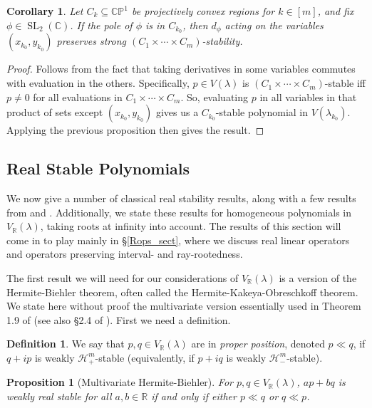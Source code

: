 \documentclass{article}
\newtheorem{proposition}[theorem]{Proposition}
\newtheorem{corollary}[theorem]{Corollary}
\theoremstyle{definition}
\newtheorem{definition}[theorem]{Definition}
\theoremstyle{plain}
\newcommand{\C}{\mathbb{C}}
\newcommand{\R}{\mathbb{R}}
\newcommand{\CP}{\mathbb{CP}}
\newcommand{\UHP}{\mathcal{H}_+}
\newcommand{\LHP}{\mathcal{H}_-}
\DeclareMathOperator{\SL}{SL}
\begin{document}
\begin{corollary}\label{laguerre_cor}
    Let $C_k \subseteq \CP^1$ be projectively convex regions for $k \in [m]$, and fix $\phi \in \SL_2(\C)$. If the pole of $\phi$ is in $C_{k_0}$, then $d_\phi$ acting on the variables $(x_{k_0},y_{k_0})$ preserves strong $(C_1 \times \cdots \times C_m)$-stability.
\end{corollary}
\begin{proof}
    Follows from the fact that taking derivatives in some variables commutes with evaluation in the others. Specifically, $p \in V(\lambda)$ is $(C_1 \times \cdots \times C_m)$-stable iff $p \neq 0$ for all evaluations in $C_1 \times \cdots \times C_m$. So, evaluating $p$ in all variables in that product of sets except $(x_{k_0},y_{k_0})$ gives us a $C_{k_0}$-stable polynomial in $V(\lambda_{k_0})$. Applying the previous proposition then gives the result.
\end{proof}

\subsection{Real Stable Polynomials}\label{stab_subsect}

We now give a number of classical real stability results, along with a few results from \cite{bb1} and \cite{bb2}. Additionally, we state these results for homogeneous polynomials in $V_\R(\lambda)$, taking roots at infinity into account. The results of this section will come in to play mainly in \S\ref{Rops_sect}, where we discuss real linear operators and operators preserving interval- and ray-rootedness.

The first result we will need for our considerations of $V_\R(\lambda)$ is a version of the Hermite-Biehler theorem, often called the Hermite-Kakeya-Obreschkoff theorem. We state here without proof the multivariate version essentially used in Theorem 1.9 of \cite{bb1} (see also \S2.4 of \cite{wagner2011polys}). First we need a definition.

\begin{definition}\label{pp_def}
    We say that $p,q \in V_\R(\lambda)$ are in \emph{proper position}, denoted $p \ll q$, if $q + ip$ is weakly $\UHP^m$-stable (equivalently, if $p + iq$ is weakly $\LHP^m$-stable).
\end{definition}

\begin{proposition}[Multivariate Hermite-Biehler] \label{hermite-biehler}
    For $p,q \in V_\R(\lambda)$, $ap + bq$ is weakly real stable for all $a,b \in \R$ if and only if either $p \ll q$ or $q \ll p$.
\end{proposition}
\end{document}
